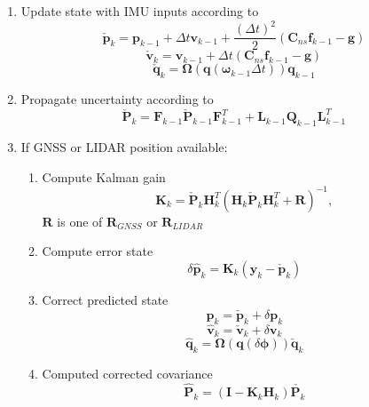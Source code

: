 \begin{enumerate}
\item Update state with IMU inputs according to
\begin{equation}
\check{\mathbf{p}}_k = \mathbf{p}_{k-1} + \Delta t \mathbf{v}_{k-1} + \frac{(\Delta t)^2}{2}(\mathbf{C}_{ns}\mathbf{f}_{k-1} - \mathbf{g}) 
\end{equation}
\begin{equation}
\check{\mathbf{v}}_k = \mathbf{v}_{k-1} + \Delta t (\mathbf{C}_{ns}\mathbf{f}_{k-1} - \mathbf{g}) 
\end{equation}
\begin{equation}
\check{\mathbf{q}}_k = \boldsymbol{\Omega} (\mathbf{q}(\boldsymbol{\omega}_{k-1} \Delta t))\mathbf{q}_{k-1} 
\end{equation}
\item  Propagate uncertainty according to 
\begin{equation}
\check{\mathbf{P}}_k = \mathbf{F}_{k-1}\check{\mathbf{P}}_{k-1} \mathbf{F}_{k-1}^T + \mathbf{L}_{k-1}\mathbf{Q}_{k-1}\mathbf{L}_{k-1}^T
\end{equation}
\item  If GNSS or LIDAR position available:
\begin{enumerate}
\item  Compute Kalman gain
\begin{equation}
\mathbf{K}_k = \check{\mathbf{P}}_k\mathbf{H}_{k}^T(\mathbf{H}_{k}\check{\mathbf{P}}_k\mathbf{H}_{k}^T + \mathbf{R})^{-1}, 
\end{equation}
$\mathbf{R}$ is one of $\mathbf{R}_{GNSS}$ or $\mathbf{R}_{LIDAR}$ 
\item  Compute error state
\begin{equation}
\delta\hat{\mathbf{p}}_k = \mathbf{K}_k(\mathbf{y}_k - \check{\mathbf{p}}_k) 
\end{equation}
\item Correct predicted state
\begin{equation}
\hat{\mathbf{p}}_k = \check{\mathbf{p}}_k +\delta \mathbf{p}_k 
\end{equation}
\begin{equation}
\hat{\mathbf{v}}_k = \check{\mathbf{v}}_k +\delta \mathbf{v}_k 
\end{equation}
\begin{equation}
\hat{\mathbf{q}}_k = \boldsymbol{\Omega}(\mathbf{q}(\delta \boldsymbol{\phi}))\check{\mathbf{q}}_k 
\end{equation}
\item Computed corrected covariance
\begin{equation}
\hat{\mathbf{P}}_k = (\mathbf{I} - \mathbf{K}_{k} \mathbf{H}_{k})\check{\mathbf{P}_{k}} 
\end{equation}
\end{enumerate}
\end{enumerate}


